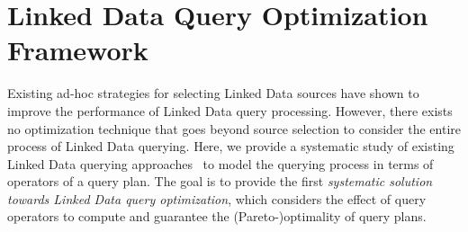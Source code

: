 \section{Linked Data Query Optimization Framework}
\label{sec:framework}
Existing ad-hoc strategies for selecting Linked Data sources have shown to improve the performance of Linked Data query processing. However, there exists no optimization technique that goes beyond source selection to consider the entire process of Linked Data querying. Here, we provide a systematic study of existing Linked Data querying approaches~\cite{hartig_executing_2009,harth_data_2010,ladwig_linked_2010} to model the querying process in terms of operators of a query plan. The goal is to provide the first \emph{systematic solution towards Linked Data query optimization}, which considers the effect of query operators to compute and guarantee the (Pareto-)optimality of query plans. 



